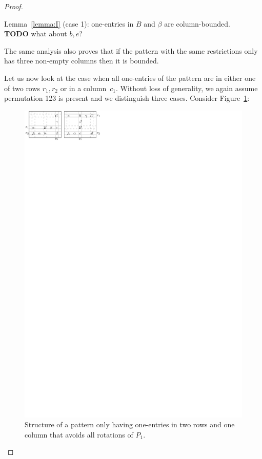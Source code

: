 \begin{proof}
\begin{itemize}
\begin{itemize}
\begin{itemize}
						Lemma~\ref{lemma:I} (case 1): one-entries in $B$ and $\beta$ are column-bounded.\\
						\textbf{TODO} what about $b,e$?
				\end{itemize}
		\end{itemize}
\end{itemize}
The same analysis also proves that if the pattern with the same restrictions only has three non-empty columns then it is bounded.

Let us now look at the case when all one-entries of the pattern are in either one of two rows $r_1,r_2$ or in a column~$c_1$. Without loss of generality, we again assume permutation 123 is present and we distinguish three cases. Consider Figure~\ref{fig:twoplusone}:
\begin{figure}[!ht]
	\centering
	\includegraphics[width=120mm]{img/twoplusone.pdf}
	\caption{Structure of a pattern only having one-entries in two rows and one column that avoids all rotations of $P_1$.}
	\label{fig:twoplusone}
\end{figure}

\end{proof}
